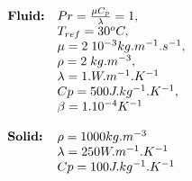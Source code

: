 \documentclass[10pt]{beamer}
\begin{document}
\begin{frame}
\begin{block}{}
\begin{columns}[c]
$$
\begin{array}{ll}
\mbox{\textbf{Fluid:}}      & Pr=\frac{\mu C_p}{\lambda}=1, \\
                            & T_{ref}=30^o C,\\
                            & \mu=2 \; 10^{-3} kg.m^{-1}.s^{-1},\\
                            & \rho=2 \; kg.m^{-3},\\
                            & \lambda=1. W.m^{-1}.K^{-1} \\
                            & Cp=500 J.kg^{-1}.K^{-1},\\
                            & \beta=1.10^{-4} K^{-1} \\
                            &  \\
\mbox{\textbf{Solid:}}      & \rho=1000 kg.m^{-3} \\
                            & \lambda=250 W.m^{-1}.K^{-1} \\
                            & Cp=100 J.kg^{-1}.K^{-1}
\end{array}
$$

\end{columns}

\end{block}
\end{frame}
\end{document}

